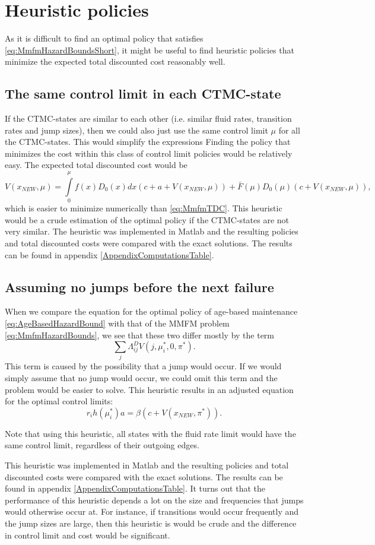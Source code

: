 \section{Heuristic policies}
As it is difficult to find an optimal policy that satisfies \eqref{eq:MmfmHazardBoundsShort}, it might be useful to find heuristic policies that minimize the expected total discounted cost reasonably well.

\subsection{The same control limit in each CTMC-state}
If the CTMC-states are similar to each other (i.e. similar fluid rates, transition rates and jump sizes), then we could also just use the same control limit $\mu$ for all the CTMC-states.
This would simplify the expressions 
Finding the policy that minimizes the cost within this class of control limit policies would be relatively easy.
The expected total discounted cost would be
\[
V(x_{NEW},\mu)=\int\limits_0^\mu f(x)D_0(x)dx (c+a+V(x_{NEW},\mu))+\bar{F}(\mu)D_0(\mu)(c+V(x_{NEW},\mu)),
\]
which is easier to minimize numerically than \eqref{eq:MmfmTDC}.
This heuristic would be a crude estimation of the optimal policy if the  CTMC-states are not very similar. 
The heuristic was implemented in Matlab and the resulting policies and total discounted costs were compared with the exact solutions.
The results can be found in appendix \ref{AppendixComputationsTable}.

\subsection{Assuming no jumps before the next failure}
When we compare the equation for the optimal policy of age-based maintenance \eqref{eq:AgeBasedHazardBound} with that of the MMFM problem \eqref{eq:MmfmHazardBounds},
we see that these two differ mostly by the term 
\[
\sum\limits_j\Lambda^D_{ij}V(j,\mu_i^*,0,\pi^*).
\]
This term is caused by the possibility that a jump would occur.
If we would simply assume that no jump would occur, we could omit this term and the problem would be easier to solve.
This heuristic results in an adjusted equation for the optimal control limits:
\[
r_ih(\mu_i^*)a=\beta(c+V(x_{NEW},\pi^*)).
\]
\begin{remark}
	Note that using this heuristic, all states with the fluid rate limit would have the same control limit, regardless of their outgoing edges.
\end{remark}
This heuristic was implemented in Matlab and the resulting policies and total discounted costs were compared with the exact solutions.
The results can be found in appendix \ref{AppendixComputationsTable}.
It turns out that the performance of this heuristic depends a lot on the size and frequencies that jumps would otherwise occur at.
For instance, if transitions would occur frequently and the jump sizes are large, then this heuristic is would be crude and the difference in control limit and cost would be significant.